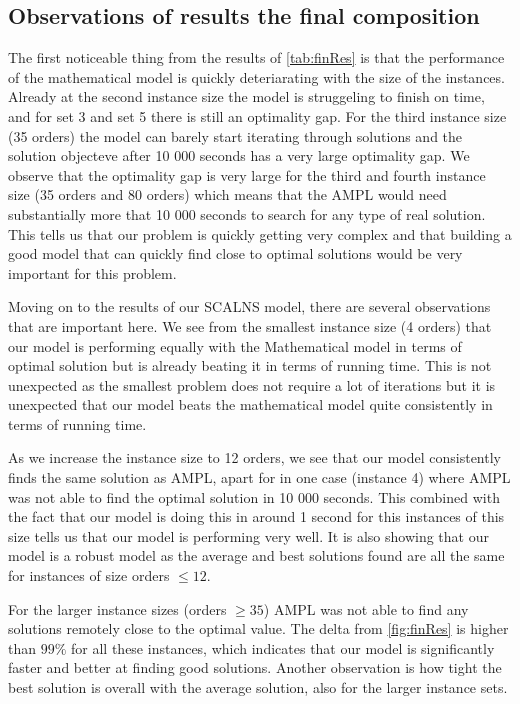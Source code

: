 \documentclass[../main.tex]{subfiles}
\begin{document}
\subsection{Observations of results  the final composition}
\label{sec:finalObs}
The first noticeable thing from the results of \cref{tab:finRes} is that the performance of the mathematical model is quickly deteriarating with the size of the instances.
Already at the second instance size the model is struggeling to finish on time, and for set 3 and set 5 there is still an optimality gap.
For the third instance size (35 orders) the model can barely start iterating through solutions and the solution objecteve after 10 000 seconds has a very large optimality gap. 
We observe that the optimality gap is very large for the third and fourth instance size (35 orders and 80 orders) which means that the AMPL would need substantially more that 10 000 seconds to search for any type of real solution.
This tells us that our problem is quickly getting very complex and that building a good model that can quickly find close to optimal solutions would be very important for this problem.
\par
Moving on to the results of our SCALNS model, there are several observations that are important here. 
We see from the smallest instance size (4 orders) that our model is performing equally with the Mathematical model in terms of optimal solution but is already beating it in terms of running time.
This is not unexpected as the smallest problem does not require a lot of iterations but it is unexpected that our model beats the mathematical model quite consistently in terms of running time.
\par
As we increase the instance size to 12 orders, we see that our model consistently finds the same solution as AMPL, apart for in one case (instance 4) where AMPL was not able to find the optimal solution in 10 000 seconds.
This combined with the fact that our model is doing this in around 1 second for this instances of this size tells us that our model is performing very well.
It is also showing that our model is a robust model as the average and best solutions found are all the same for instances of size orders $\leq12$.
\par
For the larger instance sizes (orders $\geq35$) AMPL was not able to find any solutions remotely close to the optimal value. The delta from \cref{fig:finRes} is higher than $99\%$ for all these instances, which indicates that our model is significantly faster and better at finding good solutions.
Another observation is how tight the best solution is overall with the average solution, also for the larger instance sets. 
\end{document}
